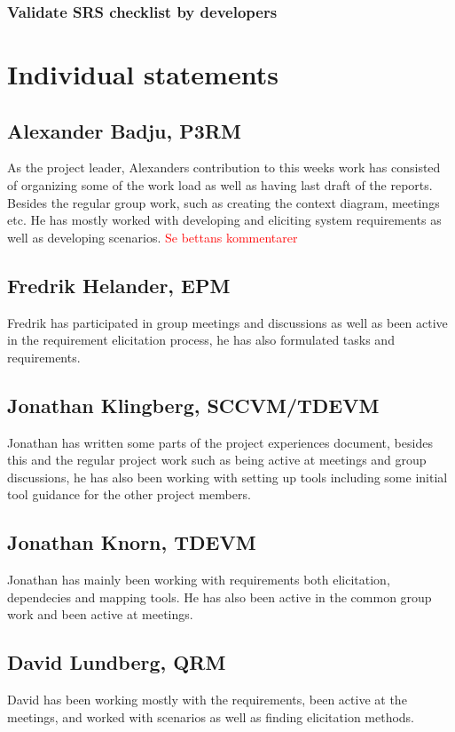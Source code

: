\documentclass[10pt]{article}
\newcommand\todo[1]{\textcolor{red}{#1}}
\begin{document}
\subsubsection{Validate SRS checklist by developers}

\section{Individual statements}
\noindent
\subsection{Alexander Badju, P3RM}
As the project leader, Alexanders contribution to this weeks work has consisted of organizing some of the work load as well as having last draft of the reports. Besides the regular group work, such as creating the context diagram, meetings etc. He has mostly worked with developing and eliciting system requirements as well as developing scenarios. 
\todo{Se bettans kommentarer}
\subsection{Fredrik Helander, EPM}
Fredrik has participated in group meetings and discussions as well as been active in the requirement elicitation process, he has also formulated tasks and requirements.  
\subsection{Jonathan Klingberg, SCCVM/TDEVM}
Jonathan has written some parts of the project experiences document, besides this and the regular project work such as being active at meetings and group discussions, he has also been working with setting up tools including some initial tool guidance for the other project members.
\subsection{Jonathan Knorn, TDEVM}
Jonathan has mainly been working with requirements both elicitation, dependecies and mapping tools. He has also been active in the common group work and been active at meetings.
\subsection{David Lundberg, QRM}
David has been working mostly with the requirements, been active at the meetings, and worked with scenarios as well as finding elicitation methods.
\end{document}
